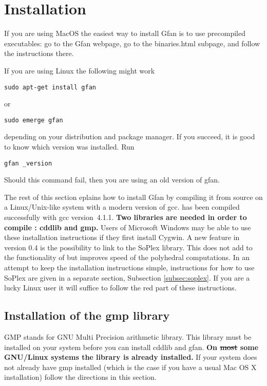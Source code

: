 \newpage
\section{Installation}
\label{sec:installation}
If you are using MacOS the easiest way to install Gfan is to use precompiled executables: go to the Gfan webpage, go to the binaries.html subpage, and follow the instructions there.

If you are using Linux the following might work
\begin{verbatim}
sudo apt-get install gfan
\end{verbatim}
or
\begin{verbatim}
sudo emerge gfan
\end{verbatim}
depending on your distribution and package manager. If you succeed, it is good to know which version was installed. Run
\begin{verbatim}
gfan _version
\end{verbatim} 
Should this command fail, then you are using an old version of gfan.


The rest of this section eplains how to install Gfan by compiling it from source on a Linux/Unix-like
system with a modern version of gcc. \name has been compiled
successfully with gcc version~4.1.1. {\bf Two libraries are needed in order
to compile \name: {cddlib} and { gmp}.} Users of Microsoft
Windows may be able to use these installation instructions if they
first install Cygwin. A new feature in \name version 0.4 is the
possibility to link to the SoPlex \cite{wunderling} library. This does
not add to the functionality of \name but improves speed of the
polyhedral computations. In an attempt to keep the installation instructions simple, instructions for how to use SoPlex are given in a separate section, Subsection \ref{subsec:soplex}. {\color{red} If you are a lucky Linux user it will suffice to follow the red part of these instructions.}

\subsection{Installation of the gmp library}
GMP stands for GNU Multi Precision arithmetic library. This library
must be installed on your system before you can install cddlib and
gfan.
{\color{red}
{\bf On \sout{most} some GNU/Linux systems the library is already installed.}}
If your system does not already
have gmp installed (which is the case if you have a usual Mac OS X
installation) follow the directions in this section.

